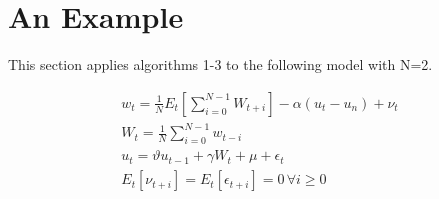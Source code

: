 \documentclass{elsart}
\begin{document}






  







\section{An Example}
\label{sec:exampleapp}

  

  

This section applies algorithms 1-3  to 
 the following model with N=2.\cite{taylor79:stagg}

\begin{gather}
  w_t=\frac{1}{N}E_t[\sum_{i=0}^{N-1}W_{t+i}] - \alpha (u_t-u_n) + \nu_t\\
W_t=\frac{1}{N}\sum_{i=0}^{N-1}w_{t-i} \\
u_t=\vartheta u_{t-1}+\gamma W_t +\mu+\epsilon_t\\
E_t[\nu_{t+i}]=E_t[\epsilon_{t+i}]=0 \,\forall i\ge0
\end{gather}




%  




  

%
  
\end{document}
